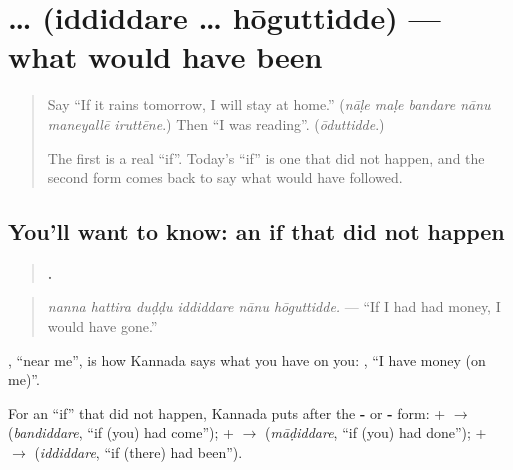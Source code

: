 \section[\texorpdfstring{\kn{ಇದ್ದಿದ್ದರೆ} … \kn{ಹೋಗುತ್ತಿದ್ದೆ} (iddiddare … …)}{ಇದ್ದಿದ್ದರೆ … ಹೋಗುತ್ತಿದ್ದೆ (iddiddare … …)}]{ …  (iddiddare … hōguttidde) — what would have been}

\label{lesson:KA-C318-iddiddare}



\begin{quote}
Say \textquotedblleft{}If it rains tomorrow, I will stay at home.\textquotedblright{} (\emph{nāḷe maḷe bandare nānu maneyallē iruttēne}.) Then \textquotedblleft{}I was reading\textquotedblright{}. (\emph{ōduttidde}.)

The first is a real \textquotedblleft{}if\textquotedblright{}. Today's \textquotedblleft{}if\textquotedblright{} is one that did not happen, and the second form comes back to say what would have followed.
\end{quote}

\subsection*{You'll want to know: an if that did not happen}
\begin{quote}
\textbf{     .}
\end{quote}

\begin{quote}
\emph{nanna hattira duḍḍu iddiddare nānu hōguttidde.} — \textquotedblleft{}If I had had money, I would have gone.\textquotedblright{}
\end{quote}

\textbf{ }, \textquotedblleft{}near me\textquotedblright{}, is how Kannada says what you have on you: \textbf{   }, \textquotedblleft{}I have money (on me)\textquotedblright{}.

For an \textquotedblleft{}if\textquotedblright{} that did not happen, Kannada puts \textbf{} after the \textbf{-} or \textbf{-} form: \textbf{} + \textbf{} $\to$ \textbf{} (\emph{bandiddare}, \textquotedblleft{}if (you) had come\textquotedblright{}); \textbf{} + \textbf{} $\to$ \textbf{} (\emph{māḍiddare}, \textquotedblleft{}if (you) had done\textquotedblright{}); \textbf{} + \textbf{} $\to$ \textbf{} (\emph{iddiddare}, \textquotedblleft{}if (there) had been\textquotedblright{}).

